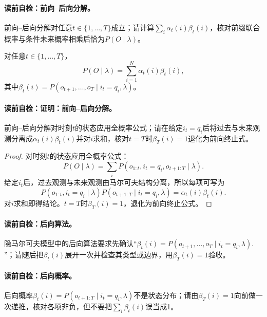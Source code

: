 \label{struct:V3-C05-CH12}
\paragraph{读前自检：前向--后向分解。}前向--后向分解对任意$t\in\{1,\ldots,T\}$成立；请计算$\sum_i\alpha_t(i)\beta_t(i)$，核对前缀联合概率与条件未来概率相乘后恰为$P(O\mid\lambda)$。\par

\begin{theorem}[前向--后向分解]\label{thm:V3-C05-forward-backward}
对任意$t\in\{1,\ldots,T\}$，
\[
P(O\mid\lambda)=\sum_{i=1}^{N}\alpha_t(i)\beta_t(i),
\]
其中$\beta_t(i)=P(o_{t+1},\ldots,o_T\mid i_t=q_i,\lambda)$。
\end{theorem}

\label{struct:V3-C05-CH13}
\paragraph{读前自检：证明：前向--后向分解。}前向--后向分解对时刻$t$的状态应用全概率公式；请在给定$i_t=q_i$后将过去与未来观测分离成$\alpha_t(i)\beta_t(i)$并对$i$求和，核对$t=T$时$\beta_T(i)=1$退化为前向终止式。\par

\begin{proof}
对时刻$t$的状态应用全概率公式：
\[
P(O\mid\lambda)=\sum_iP(o_{1:t},i_t=q_i,o_{t+1:T}\mid\lambda).
\]
给定$i_t$后，过去观测与未来观测由马尔可夫结构分离，所以每项可写为
\[
P(o_{1:t},i_t=q_i\mid\lambda)
P(o_{t+1:T}\mid i_t=q_i,\lambda)=\alpha_t(i)\beta_t(i).
\]
对$i$求和即得结论。$t=T$时$\beta_T(i)=1$，退化为前向终止公式。
\end{proof}

\paragraph{读前自检：后向算法。}隐马尔可夫模型中的后向算法要求先确认“$\beta_t(i)=P(o_{t+1},\ldots,o_T\mid i_t=q_i,\lambda).$”；请随后把$\beta_t(i)$展开一次并检查其类型或边界，用$\beta_T(i)=1$验收。\par
\paragraph{读前自检：后向概率。}后向概率$\beta_t(i)=P(o_{t+1:T}\mid i_t=q_i,\lambda)$不是状态分布；请由$\beta_T(i)=1$向前做一次递推，核对各项非负，但不要把$\sum_i\beta_t(i)$误当成1。\par

